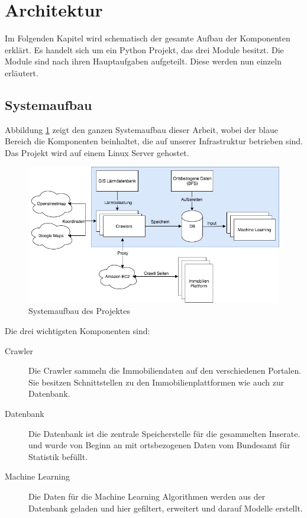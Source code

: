 \section{Architektur}
Im Folgenden Kapitel wird schematisch der gesamte Aufbau der Komponenten erklärt. Es handelt sich um ein Python Projekt, das drei Module besitzt. Die Module sind nach ihren Hauptaufgaben aufgeteilt. Diese werden nun einzeln erläutert.

\subsection{Systemaufbau}
Abbildung \ref{fig:system} zeigt den ganzen Systemaufbau dieser Arbeit, wobei der blaue Bereich die Komponenten beinhaltet, die auf unserer Infrastruktur betrieben sind. Das Projekt wird auf einem Linux Server gehostet.

\begin{figure}[ht]
\centering
\includegraphics[width=\textwidth]{images/Architektur.png}
\caption[Systemaufbau des Projektes]{Systemaufbau des Projektes}%
\label{fig:system}
\end{figure}

Die drei wichtigsten Komponenten sind:
\begin{description}
\item[Crawler] Die Crawler sammeln die Immobiliendaten auf den verschiedenen Portalen. Sie besitzen Schnittstellen zu den Immobilienplattformen wie auch zur Datenbank.
\item[Datenbank] Die Datenbank ist die zentrale Speicherstelle für die gesammelten Inserate. und wurde von Beginn an mit ortsbezogenen Daten vom Bundesamt für Statistik befüllt.
\item[Machine Learning] Die Daten für die Machine Learning Algorithmen werden aus der Datenbank geladen und hier gefiltert, erweitert und darauf Modelle erstellt.
\end{description}

